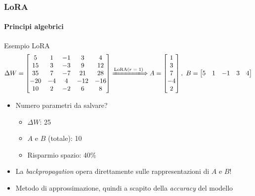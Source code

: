 %
\begin{frame}[t] \frametitle{LoRA}
\framesubtitle{Principi algebrici}
{\small
    \begin{minipage}[t]{\textwidth}
        \vspace*{-.5cm}
        \begin{block}{Esempio LoRA}
            \[
                \Delta W =
                \begin{bmatrix}
                5 & 1 & -1 & 3 & 4\\
                15 & 3 & -3 & 9 & 12\\
                35 & 7 & -7 & 21 & 28\\
                -20 & -4 & 4 & -12 & -16\\
                10 & 2 & -2 & 6 & 8\\
                \end{bmatrix} \xLongrightarrow[]{\text{LoRA($r=1$)}}
                A =
                    \begin{bmatrix}
                        1 \\
                        3 \\
                        7 \\
                        -4\\
                        2
                    \end{bmatrix},\ B=
                    \begin{bmatrix}
                        5 & 1 & -1 & 3 & 4
                    \end{bmatrix}
            \]
        \end{block}
    \end{minipage}
    \begin{minipage}[t]{\textwidth}
        \vspace*{.5cm}
        {\small
            \begin{itemize}[leftmargin=10pt,align=right]
                \item[\alert{\faArrowCircleRight}] Numero parametri da salvare?
                \begin{itemize}[leftmargin=10pt,align=right]
                    \item[\alert{\faArrowCircleRight}] $\Delta W$: 25
                    \item[\alert{\faArrowCircleRight}] $A$ e $B$ (totale): 10
                    \item[\alert{\faArrowCircleRight}] Risparmio spazio: \alert{40\%}
                \end{itemize}
                \item[\alert{\faArrowCircleRight}] La \emph{backpropagation} opera direttamente sulle rappresentazioni di $A$ e $B$!
                \item[\alert{\faExclamationTriangle}] Metodo di \alert{approssimazione}, quindi a scapito della \emph{accuracy} del modello
            \end{itemize}
        }
    \end{minipage}
}
\end{frame}
